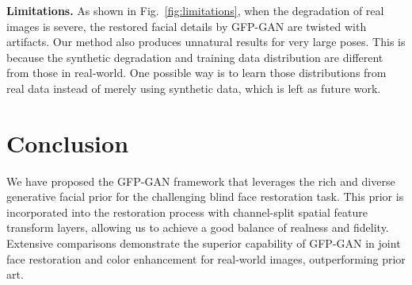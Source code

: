 \documentclass[final]{cvpr}
\begin{document}
\noindent\textbf{Limitations.}
As shown in Fig.~\ref{fig:limitations}, when the degradation of real images is severe, the restored facial details by GFP-GAN are twisted with artifacts. Our method also produces 
unnatural results for very large poses. 
This is because the synthetic degradation and training data distribution are different from those in real-world. 
One possible way is to learn those distributions from real data instead of merely using synthetic data, which is left as future work.

 
\vspace{-0.2cm}
\section{Conclusion}
\vspace{-0.2cm}
We have proposed the GFP-GAN framework that leverages the rich and diverse generative facial prior for the challenging blind face restoration task. 
This prior is incorporated into the restoration process with channel-split spatial feature transform layers, allowing us to achieve a good balance of realness and fidelity. 
Extensive comparisons demonstrate the superior capability of GFP-GAN in joint face restoration and color enhancement for real-world images, outperforming prior art.


\newpage
{\small


}
\end{document}
